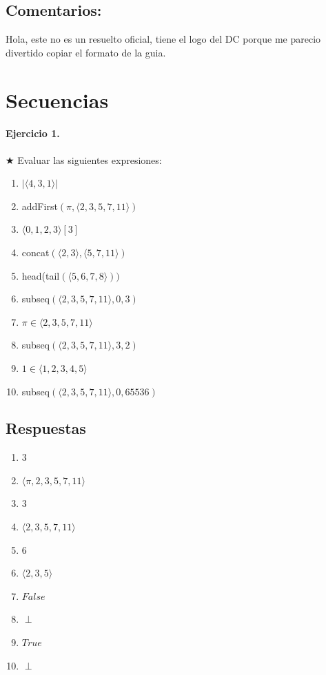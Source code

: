 \documentclass[a4paper]{article}
\begin{document}

\subsection*{Comentarios:}
Hola, este no es un resuelto oficial, tiene el logo del DC porque me parecio divertido copiar el formato de la guia.\\
\section{Secuencias}

\paragraph{\textbf{Ejercicio 1.}} $\bigstar $ Evaluar las siguientes expresiones:

\begin{multicols}{2}
\begin{enumerate}[label=\alph*)]
\item $ \vert \langle 4,3,1\rangle \vert$
\item addFirst$(\pi,\langle 2,3,5,7,11\rangle )$
\item $\langle 0,1,2,3\rangle [3]$
\item concat$(\langle 2,3\rangle ,\langle 5,7,11\rangle )$
\item head(tail$(\langle 5,6,7,8\rangle))$
\item subseq$(\langle 2,3,5,7,11\rangle ,0,3)$
\item $\pi \in \langle 2,3,5,7,11\rangle$
\item subseq$(\langle 2,3,5,7,11\rangle ,3,2)$
\item $1\in \langle 1,2,3,4,5\rangle$
\item subseq$(\langle 2,3,5,7,11\rangle , 0,65536)$
\end{enumerate} 
\end{multicols}

\subsection*{Respuestas}

\begin{multicols}{2}
\begin{enumerate}[label=\alph*)]
\item $3$
\item $\langle \pi,2,3,5,7,11\rangle$
\item $3$
\item $\langle 2,3,5,7,11\rangle$
\item $6$
\item $\langle 2,3,5 \rangle$
\item $False$
\item $\perp$
\item $True$
\item $\perp$
\end{enumerate}
\end{multicols}
\end{document}
